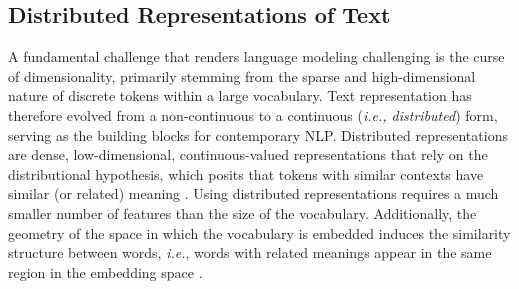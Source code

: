 

\subsection{Distributed Representations of Text}

A fundamental challenge that renders language modeling challenging is the curse of dimensionality, primarily stemming from the sparse and high-dimensional nature of discrete tokens within a large vocabulary. Text representation has therefore evolved from a non-continuous to a continuous (\textit{i.e., distributed}) form, serving as the building blocks for contemporary \ac{NLP}. Distributed representations are dense, low-dimensional, continuous-valued representations that rely on the distributional hypothesis, which posits that tokens with similar contexts have similar (or related) meaning \citep{mikolov2013efficient}. Using distributed representations requires a much smaller number of features than the size of the vocabulary. Additionally, the geometry of the space in which the vocabulary is embedded induces the similarity structure between words, \textit{i.e.}, words with related meanings appear in the same region in the embedding space \citep{shazeer2016swivel}.

